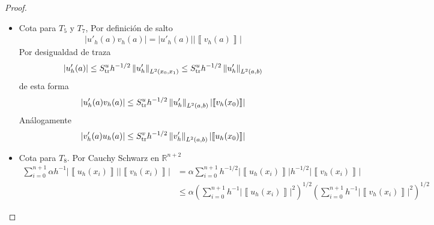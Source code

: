 \documentclass[10pt,a4paper]{report}
\providecommand{\abs}[1]{\left\lvert#1\right\rvert}
\providecommand{\norm}[1]{\left\lVert#1\right\rVert}
\providecommand{\salto}[1]{\left\llbracket#1\right\rrbracket}
\begin{document}
\begin{proof}
\begin{itemize}
\begin{itemize}
\begin{align*}
                \end{align*}
                por desigualdad de traza
                \begin{align*}
                	\abs{u'_{h}(b)} \leq C_{\textup{tr}}h^{-1/2}\norm{u'_{h}}_{L^{2}(x_{n},x_{n+1})} \leq C_{\textup{tr}}h^{-1/2}\norm{u'_{h}}_{L^{2}(a,b)}
                \end{align*}
                de esta forma
                \begin{align*}
                	\abs{u'_{h}(b)v_{h}(b)} &\leq C^{u}_{\textup{tr}}h^{-1/2}\abs{\salto{v_{h}(b)}}\norm{u'_{h}}_{L^{2}(a,b)}
                \end{align*}
                Análogamente
                \begin{align*}
                	\abs{v'_{h}(b)u_{h}(b)} \leq C^{v}_{\textup{tr}}h^{-1/2}\abs{\salto{u_{h}(b)}}\norm{v'_{h}}_{L^{2}(a,b)}
                \end{align*} 
                \item[$4)$] Cota para $T_{5}$ y $T_{7}$, Por definición de salto
                \begin{align*}
                	\abs{u'_{h}(a)v_{h}(a)} = \abs{u'_{h}(a)}\abs{\salto{v_{h}(a)}}
                \end{align*}
                Por desigualdad de traza
                \begin{align*}
                	\abs{u'_{h}(a)} \leq S^{u}_{\textup{tr}}h^{-1/2}\norm{u'_{h}}_{L^{2}(x_{0},x_{1})} \leq S^{u}_{\textup{tr}}h^{-1/2}\norm{u'_{h}}_{L^{2}(a,b)}
                \end{align*}
                de esta forma 
                \begin{align*}
                	\abs{u'_{h}(a)v_{h}(a)} \leq S^{u}_{\textup{tr}}h^{-1/2}\norm{u'_{h}}_{L^{2}(a,b)}\abs{\salto{v_{h}(x_{0})}}
                \end{align*}
                Análogamente
                \begin{align*}
                	\abs{v'_{h}(a)u_{h}(a)} \leq S^{v}_{\textup{tr}}h^{-1/2}\norm{v'_{h}}_{L^{2}(a,b)}\abs{\salto{u_{h}(x_{0})}}
                \end{align*}
                \item[$5)$] Cota para $T_8$. Por Cauchy Schwarz en $\mathbb{R}^{n+2}$
                \begin{align*}
                	\sum_{i=0}^{n+1}\alpha h^{-1}\abs{\salto{u_{h}(x_{i})}}\abs{\salto{v_{h}(x_{i})}} &= \alpha\sum_{i=0}^{n+1} h^{-1/2}\abs{\salto{u_{h}(x_{i})}}h^{-1/2}\abs{\salto{v_{h}(x_{i})}}\\ &\leq\alpha\left(\sum_{i=0}^{n+1} h^{-1}\abs{\salto{u_{h}(x_{i})}}^{2}\right)^{1/2}\left(\sum_{i=0}^{n+1} h^{-1}\abs{\salto{v_{h}(x_{i})}}^{2}\right)^{1/2}

\end{align*}
\end{itemize}
\end{itemize}
\end{proof}
\end{document}
